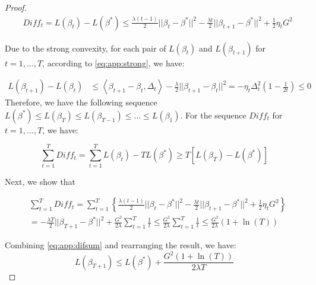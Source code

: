 \begin{proof}
	\begin{equation}\label{eq:app:it_diff}
	\begin{aligned}
	&{Diff}_t = L(\beta_t)-L(\beta^*)
	\le\frac{\lambda (t-1)}{2}{||{\beta _t} - {\beta ^*}||^2}- \frac{\lambda t}{2}{||{\beta _{t+1}} - {\beta ^*}||^2}+\frac{1}{2}{\eta _t} G^2
	\end{aligned}
	\end{equation}
	
	Due to the strong convexity, for each pair of $L(\beta_t)$ and $L(\beta_{t+1})$ for $t=1,...,T$, according to \eqref{eq:app:strong}, we have:
	
	\begin{equation}
	\begin{aligned}
	L({\beta _{t + 1}}) - L({\beta _t}) &\le \left\langle {{\beta _{t + 1}} - {\beta _t},{\Delta _t}} \right\rangle  - \frac{\lambda }{2}||{\beta _{t + 1}} - \beta_t |{|^2} =  - \eta_t\Delta _t^2 (1-\frac{1}{2t}) \leq 0
	\end{aligned}
	\end{equation}
	Therefore, we have the following sequence $L(\beta^*) \leq L(\beta_T) \leq L(\beta_{T-1}) \leq...\leq L(\beta_1)$. 
	For the sequence $Diff_t$ for $t=1,...,T$, we have:
	
	\begin{equation} \label{eq:app:difsum}
	\sum_{t=1}^{T} Diff_t =  \sum_{t=1}^{T}L(\beta_t)-TL(\beta^*) \geq T\left[L(\beta_T)-L(\beta^*)\right]
	\end{equation}
	
	Next, we show that 
	
	\begin{equation}
	\begin{aligned}
	&\sum_{t=1}^{T} Diff_t =
	\sum_{t=1}^{T}\left\{\frac{\lambda (t-1)}{2}{||{\beta _t} - {\beta ^*}||^2}- \frac{\lambda t}{2}{||{\beta _{t+1}} - {\beta ^*}||^2}+\frac{1}{2}{\eta _t} G^2\right\} \\
	&=-\frac{\lambda T}{2}{||{\beta _{T+1}-\beta^*}||^2} + \frac{G^2}{2 \lambda}\sum_{t=1}^{T} \frac{1}{t}\leq \frac{G^2}{2 \lambda}\sum_{t=1}^{T} \frac{1}{t} \leq \frac{G^2}{2 \lambda}(1+\ln(T))
	\end{aligned}
	\end{equation}
	
	Combining \eqref{eq:app:difsum} and rearranging the result, we have:
	\begin{equation*}
	L(\beta_{T+1}) \leq L(\beta^*)+\frac{G^2(1+\ln (T))}{2\lambda T}
	\end{equation*}
\end{proof}